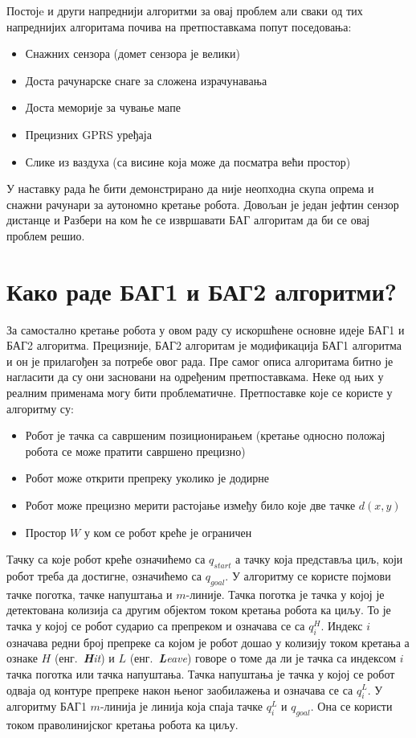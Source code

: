 \documentclass[12pt,oneside]{memoir}
\theoremstyle{remark}
\begin{document}
Постојe и други напреднији алгоритми за овај проблем али сваки од тих напреднијих алгоритама почива на претпоставкама попут поседовања:
\begin{itemize}
\item Снажних сензора (домет сензора је велики)
\item Доста рачунарске снаге за сложена израчунавања
\item Доста меморије за чување мапе
\item Прецизних GPRS уређаја
\item Слике из ваздуха (са висине која може да посматра већи простор)
\end{itemize}

У наставку рада ће бити демонстрирано да није неопходна скупа опрема и снажни рачунари за аутономно кретање робота. Довољан је један јефтин сензор дистанце и Разбери  на ком ће се извршавати БАГ алгоритам да би се овај проблем решио.

\section{Како раде БАГ1 и БАГ2 алгоритми?}
За самостално кретање робота у овом раду су искоршћене основне идеје БАГ1 и БАГ2 алгоритма. Прецизније, БАГ2 алгоритам је модификација БАГ1 алгоритма и он је прилагођен за потребе овог рада. Пре самог описа алгоритама битно је нагласити да су они засновани на одређеним претпоставкама. Неке од њих у реалним применама могу бити проблематичне. Претпоставке које се користе у алгоритму су:
\begin{itemize}
\item Робот је тачка са савршеним позиционирањем (кретање односно положај робота се може пратити савршено прецизно)
\item Робот може открити препреку уколико је додирне
\item Робот може прецизно мерити растојање између било које две тачке $d(x,y)$
\item Простор $W$ у ком се робот креће је ограничен
\end{itemize}

Тачку са које робот креће означићемо са $q_{start}$ а тачку која представља циљ, који робот треба да достигне, означићемо са $q_{goal}$. У алгоритму се користе појмови тачке поготка, тачке напуштања и $m$-линије. Тачка поготка је тачка у којој је детектована колизија са другим објектом током кретања робота ка циљу. То је тачка у којој се робот сударио са препреком и означава се са $q_i^H$. Индекс $i$ означава редни број препреке са којом је робот дошао у колизију током кретања а ознаке $H$  (енг.~{\em \textbf{H}it}) и $L$ (енг.~{\em \textbf{L}eave}) говоре о томе да ли је тачка са индексом $i$ тачка поготка или тачка напуштања. Тачка напуштања је тачка у којој се робот одваја од контуре препреке након њеног заобилажења и означава се са $q_i^L$. У алгоритму БАГ1 $m$-линија је линија која спаја тачке $q_i^L$ и $q_{goal}$. Она се користи током праволинијског кретања робота ка циљу.
\end{document}
